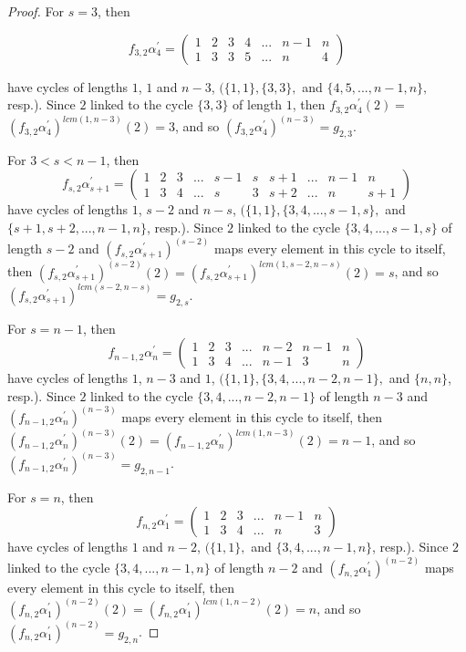 \documentclass[10pt,a4paper]{amsart}
\begin{document}
\begin{proof}
\vspace{0.3cm}
For $s=3$, then

$$f_{3,2} \alpha^{\prime}_{4}=
\begin{pmatrix}  
1&2&3&4&...&n-1&n\\1&3&3&5&...&n&4
\end{pmatrix}$$


have cycles of lengths $1$, $1$ and $n-3$, $( \{1,1\}, \{3,3\},$ and $\{4,5,...,n-1,n\},$ resp.). Since $2$ linked to the cycle $\{3,3\}$ of length $1$, then 
$f_{3,2} \alpha^{\prime}_{4}(2)=$$(f_{3,2} \alpha^{\prime}_{4})^{lcm(1,n-3)}(2)=3$, and so $(f_{3,2} \alpha^{\prime}_{4})^{(n-3)}=g_{2,3}$.

\vspace{0.5cm}
For $3<s<n-1$,
then $$f_{s,2} \alpha^{\prime}_{s+1}=
\begin{pmatrix}  
1&2&3&...&s-1&s&s+1&...&n-1&n\\1&3&4&...&s&3&s+2&...&n&s+1
\end{pmatrix}$$
have cycles of lengths $1$, $s-2$ and $n-s$, $( \{1,1\}, \{3,4,...,s-1,s\},$ and $\{s+1,s+2,...,n-1,n\}$, resp.). Since $2$ linked to the cycle $\{3,4,...,s-1,s\}$ of length $s-2$ and $(f_{s,2} \alpha^{\prime}_{s+1})^{(s-2)}$ maps every element in this cycle to itself, then $(f_{s,2} \alpha^{\prime}_{s+1})^{(s-2)}(2)=$$(f_{s,2} \alpha^{\prime}_{s+1})^{lcm(1,s-2,n-s)}(2)=s$, and so $(f_{s,2} \alpha^{\prime}_{s+1})^{lcm(s-2,n-s)}=g_{2,s}$.

\vspace{0.5cm}
For $s=n-1$,
then $$f_{n-1,2} \alpha^{\prime}_{n}=
\begin{pmatrix}  
1&2&3&...&n-2&n-1&n\\1&3&4&...&n-1&3&n
\end{pmatrix}$$
have cycles of lengths $1$, $n-3$ and $1$, $( \{1,1\}, \{3,4,...,n-2,n-1\},$ and $\{n,n\}$, resp.). Since $2$ linked to the cycle $\{3,4,...,n-2,n-1\}$ of length $n-3$ and $(f_{n-1,2} \alpha^{\prime}_{n})^{(n-3)}$ maps every element in this cycle to itself, then $(f_{n-1,2} \alpha^{\prime}_{n})^{(n-3)}(2)=(f_{n-1,2} \alpha^{\prime}_{n})^{lcm(1,n-3)}(2)=n-1$, and so $(f_{n-1,2} \alpha^{\prime}_{n})^{(n-3)}=g_{2,n-1}$.

\vspace{0.5cm}
For $s=n$,
then $$f_{n,2} \alpha^{\prime}_{1}=
\begin{pmatrix}  
1&2&3&...&n-1&n\\1&3&4&...&n&3
\end{pmatrix}$$ 
have cycles of lengths $1$ and $n-2$, $( \{1,1\},$ and $\{3,4,...,n-1,n\}$, resp.). Since $2$ linked to the cycle $\{3,4,...,n-1,n\}$ of length $n-2$ and $(f_{n,2} \alpha^{\prime}_{1})^{(n-2)}$ maps every element in this cycle to itself, then $(f_{n,2} \alpha^{\prime}_{1})^{(n-2)}(2)=(f_{n,2} \alpha^{\prime}_{1})^{lcm(1,n-2)}(2)=n$, and so $(f_{n,2} \alpha^{\prime}_{1})^{(n-2)}=g_{2,n}$.


\end{proof}
\end{document}
